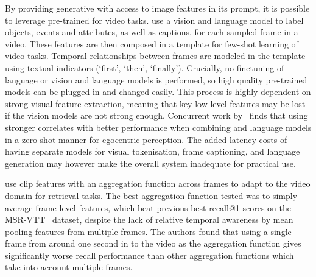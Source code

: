 By providing generative  with access to image features in its
prompt, it is possible to leverage pre-trained  for video
tasks.  \citet{wang2022vidil} use a vision and language model to label objects,
events and attributes, as well as captions, for each sampled frame in a video.
These features are then composed in a template for few-shot learning of video
tasks.  Temporal relationships between frames are modeled in the template using
textual indicators (`first', `then', `finally'). Crucially, no finetuning of
language or vision and language models is performed, so high quality
pre-trained models can be plugged in and changed easily. This process is highly
dependent on strong visual feature extraction, meaning that key low-level
features may be lost if the vision models are not strong enough. Concurrent
work by~\citet{zeng2023socratic} finds that using stronger 
correlates with better performance when combining  and language
models in a zero-shot manner for egocentric perception. The added latency costs
of having separate models for visual tokenisation, frame captioning, and
language generation may however make the overall system inadequate for
practical use.

\citet{portilloquintero2021clipvidret} use \acrshort{clip} features with an
aggregation function across frames to adapt to the video domain for retrieval
tasks. The best aggregation function tested was to simply average frame-level
features, which beat previous best recall@1 scores on the
MSR-VTT~\citep{xu2016msr-vtt} dataset, despite the lack of relative temporal
awareness by mean pooling features from multiple frames. The authors found that
using a single frame from around one second in to the video as the aggregation
function gives significantly worse recall performance than other aggregation
functions which take into account multiple frames.

